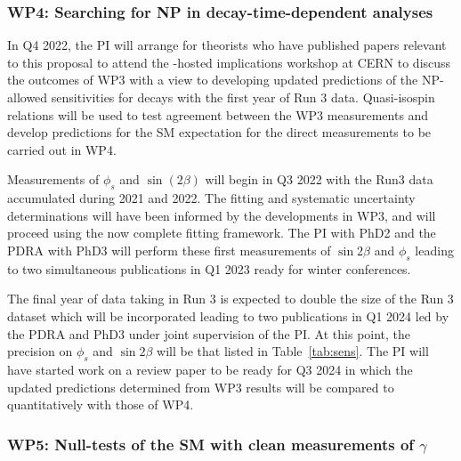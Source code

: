 \documentclass[11pt,a4paper]{article}
\begin{document}
\subsubsection{WP4: Searching for NP in decay-time-dependent analyses}

In Q4 2022, the PI will arrange for theorists who have published papers relevant to this proposal to attend the \LHCb-hosted implications workshop at CERN to discuss the outcomes of WP3 with a view to developing updated predictions of the NP-allowed sensitivities for \HepProcess{\PB\to\PD\PD} decays with the first year of Run 3 data. Quasi-isospin relations will be used to test agreement between the WP3 measurements and develop predictions for the SM expectation for the direct measurements to be carried out in WP4.

Measurements of $\phi_s$ and $\sin(2\beta)$ will begin in Q3 2022 with the Run3 data accumulated during 2021 and 2022. The fitting and systematic uncertainty determinations will have been informed by the developments in WP3, and will proceed using the now complete fitting framework. The PI with PhD2 and the PDRA with PhD3 will perform these first measurements of $\sin2\beta$ and $\phi_s$ leading to two simultaneous publications in Q1 2023 ready for winter conferences.

The final year of data taking in Run 3 is expected to double the size of the Run 3 dataset which will be incorporated leading to two publications in Q1 2024 led by the PDRA and PhD3 under joint supervision of the PI. At this point, the precision on $\phi_s$ and $\sin2\beta$ will be that listed in Table~\ref{tab:sens}. The PI will have started work on a review paper to be ready for Q3 2024 in which the updated predictions determined from WP3 results will be compared to quantitatively with those of WP4. 

\subsubsection{WP5: Null-tests of the SM with clean measurements of $\gamma$}
\end{document}
